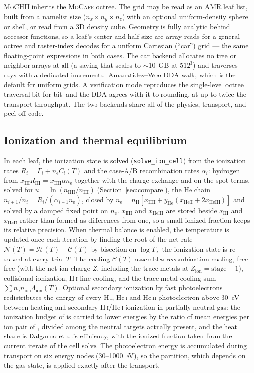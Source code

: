 \documentclass[twocolumn,linenumbers]{aastex702}
\newcommand{\code}[1]{\texttt{#1}}
\newcommand{\MoCHII}{\textsc{MoCHII}}
\newcommand{\MoCafe}{\textsc{MoCafe}}
\newcommand{\HI}{H\,\textsc{i}}
\newcommand{\HeI}{He\,\textsc{i}}
\newcommand{\HeII}{He\,\textsc{ii}}
\newcommand{\Te}{T_{\mathrm{e}}}
\newcommand{\nelec}{n_{\mathrm{e}}}
\newcommand{\nH}{n_{\mathrm{H}}}
\newcommand{\xHI}{x_{\mathrm{HI}}}
\begin{document}
\MoCHII{} inherits the \MoCafe{} octree.  The grid may be read as an AMR
leaf list, built from a namelist size ($n_x\times n_y\times n_z$) with an
optional uniform-density sphere or shell, or read from a 3D density cube.
Geometry is fully analytic behind accessor functions, so a leaf's center
and half-size are array reads for a general octree and raster-index decodes
for a uniform Cartesian (``car'') grid --- the same floating-point
expressions in both cases.  The car backend allocates no tree or neighbor
arrays at all (a saving that scales to $\sim$10~GB at $512^3$) and
traverses rays with a dedicated incremental Amanatides--Woo DDA walk, which
is the default for uniform grids.  A verification mode reproduces the
single-level octree traversal bit-for-bit, and the DDA agrees with it to
rounding, at up to twice the transport throughput.  The two backends share
all of the physics, transport, and peel-off code.

\subsection{Ionization and thermal equilibrium}
\label{sec:equil}

In each leaf, the ionization state is solved (\code{solve\_ion\_cell}) from the
ionization rates $R_i = \Gamma_i + \nelec C_i(T)$ and the case-A/B
recombination rates $\alpha_i$: hydrogen from
$\xHI R_{\mathrm{HI}} = x_{\mathrm{HII}}\alpha\nelec$ together with the
charge-exchange and on-the-spot terms, solved for
$u = \ln(n_{\mathrm{HII}}/n_{\mathrm{HI}})$ (Section~\ref{sec:compare}),
the He chain $n_{i+1}/n_i = R_i/(\alpha_{i+1}\nelec)$, closed
by $\nelec = \nH[x_{\mathrm{HII}} + y_{\mathrm{He}}(x_{\mathrm{HeII}} +
2x_{\mathrm{HeIII}})]$ and solved by a damped fixed point on $\nelec$.
$x_{\mathrm{HII}}$ and $x_{\mathrm{HeIII}}$ are stored beside $\xHI$ and
$x_{\mathrm{HeII}}$ rather than formed as differences from one, so a small
ionized fraction keeps its relative precision.  When
thermal balance is enabled, the temperature is updated once each iteration
by finding the root of the net rate $\mathcal{N}(T) = \mathcal{H}(T) -
\mathcal{C}(T)$ by bisection on $\log \Te$; the ionization state is
re-solved at every trial $T$.  The cooling $\mathcal{C}(T)$ assembles
recombination cooling, free-free (with the net ion charge $Z$, including
the trace metals at $Z_{\mathrm{ion}} = \mathrm{stage}-1$), collisional
ionization, \HI{} line cooling, and the trace-metal cooling sum
$\sum \nelec n_{\mathrm{ion}}\Lambda_{\mathrm{ion}}(T)$.  Optional secondary
ionization by fast photoelectrons redistributes the energy of every
\HI, \HeI{} and \HeII{} photoelectron above 30~eV between heating and
secondary \HI/\HeI{} ionization in partially neutral gas: the ionization
budget of \citet{shull1985} is carried to lower energies by the ratio of
mean energies per ion pair of \citet{dalgarno1999}, divided among the
neutral targets actually present, and the heat share is Dalgarno et al.'s
efficiency, with the ionized fraction taken from the current iterate of
the cell solve.  The photoelectron energy is accumulated during transport
on six energy nodes (30--1000~eV), so the partition, which depends on the
gas state, is applied exactly after the transport.
\end{document}
